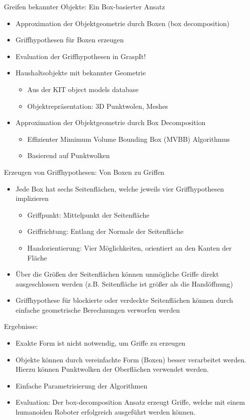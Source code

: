\documentclass[paper=a4, fontsize=11pt]{scrartcl} %
\numberwithin{equation}{section} %
\numberwithin{figure}{section} %
\numberwithin{table}{section} %
\begin{document}
Greifen bekannter Objekte: Ein Box-basierter Ansatz
\begin{itemize}
\item Approximation der Objektgeometrie durch Boxen (box decomposition) 
\item Griffhypothesen für Boxen erzeugen
\item Evaluation der Griffhypothesen in GraspIt!
\item Haushaltsobjekte mit bekannter Geometrie
\begin{itemize}
\item Aus der KIT object models database
\item Objektrepräsentation: 3D Punktwolen, Meshes
\end{itemize}
\item Approximation der Objektgeometrie durch Box Decomposition
\begin{itemize}
\item Effizienter Mimimum Volume Bounding Box (MVBB) Algorithmus
\item Basierend auf Punktwolken
\end{itemize}
\end{itemize}

Erzeugen von Griffhypothesen: Von Boxen zu Griffen
\begin{itemize}
\item Jede Box hat sechs Seitenflächen, welche jeweils vier Griffhypothesen implizieren
\begin{itemize}
\item Griffpunkt: Mittelpunkt der Seitenfläche
\item Griffrichtung: Entlang der Normale der Seitenfläche
\item Handorientierung: Vier Möglichkeiten, orientiert an den Kanten der Fläche
\end{itemize}
\item Über die Größen der Seitenflächen können unmögliche Griffe direkt ausgeschlossen werden (z.B. Seitenfläche ist größer als die Handöffnung)
\item Griffhypothese für blockierte oder verdeckte Seitenflächen können durch einfache geometrische Berechnungen verworfen werden
\end{itemize}

Ergebnisse:
\begin{itemize}
\item Exakte Form ist nicht notwendig, um Griffe zu erzeugen
\item Objekte können durch vereinfachte Form (Boxen) besser verarbeitet werden. Hierzu können Punktwolken der Oberflächen verwendet werden.
\item Einfache Parametrisierung der Algorithmen
\item Evaluation: Der box-decomposition Ansatz erzeugt Griffe, welche mit einem humanoiden Roboter erfolgreich ausgeführt werden können.
\end{itemize}
\end{document}
